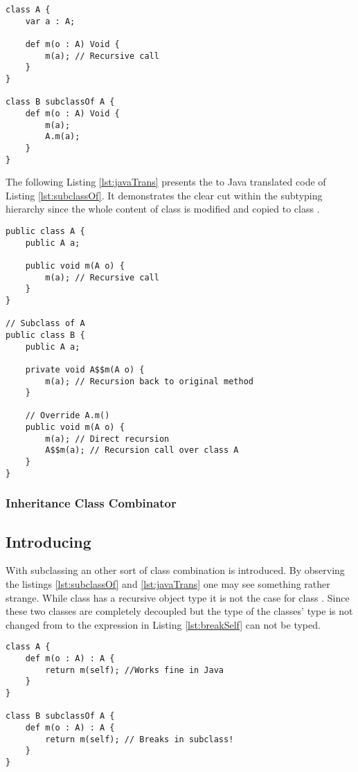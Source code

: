 \begin{lstlisting}[float,language=ooplss,caption=Subclassing in \ooplss,label=lst:subclassOf]
class A {
	var a : A;

	def m(o : A) Void {
		m(a); // Recursive call
	}
}

class B subclassOf A {
	def m(o : A) Void {
		m(a);
		A.m(a);
	}
}
\end{lstlisting}

The following Listing \ref{lst:javaTrans} presents the to Java translated
code of Listing \ref{lst:subclassOf}. It demonstrates the clear cut within 
the subtyping hierarchy since the whole content of class \A is modified
and copied to class \B.

\begin{lstlisting}[float,caption=Subclassing translated in Java,label=lst:javaTrans]
public class A {
	public A a;

	public void m(A o) {
		m(a); // Recursive call
	}
}

// Subclass of A
public class B {
	public A a;

	private void A$$m(A o) {
		m(a); // Recursion back to original method
	}

	// Override A.m()
	public void m(A o) {
		m(a); // Direct recursion
		A$$m(a); // Recursion call over class A
	}
}
\end{lstlisting}

\subsubsection{Inheritance Class Combinator}

\subsection{Introducing \mytype}
With subclassing an other sort of class combination is introduced. By
observing the listings \ref{lst:subclassOf} and \ref{lst:javaTrans}
one may see something rather strange. While class \A has a recursive
object type it is not the case for class \B. Since these two classes are
completely decoupled but the type of the classes' type is not changed from
\A to \B the expression in Listing \ref{lst:breakSelf} can not be typed.

\begin{lstlisting}[float,language=ooplss,caption=Illegal method m(o : \A) : \emph{Void} in class \B,label=lst:breakSelf]
class A {
	def m(o : A) : A {
		return m(self); //Works fine in Java
	}
}

class B subclassOf A {
	def m(o : A) : A {
		return m(self); // Breaks in subclass!
	}
}
\end{lstlisting}

